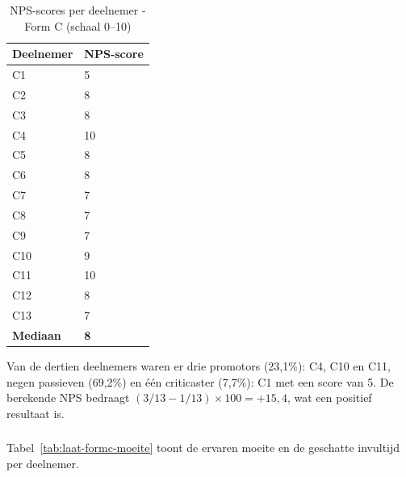 \begin{table}[h]
  \centering
  \caption[NPS-scores late test Form C]{NPS-scores per deelnemer - Form C (schaal 0–10)}
  \label{tab:laat-formc-nps}
  \begin{tabular}{ll}
    \hline
    \textbf{Deelnemer} & \textbf{NPS-score} \\
    \hline
    C1  & 5  \\
    C2  & 8  \\
    C3  & 8  \\
    C4  & 10 \\
    C5  & 8  \\
    C6  & 8  \\
    C7  & 7  \\
    C8  & 7  \\
    C9  & 7  \\
    C10 & 9  \\
    C11 & 10 \\
    C12 & 8  \\
    C13 & 7  \\
    \hline
    \textbf{Mediaan} & \textbf{8} \\
    \hline
  \end{tabular}
\end{table}

Van de dertien deelnemers waren er drie promotors (23,1\%): C4, C10 en C11, negen passieven (69,2\%) en één criticaster (7,7\%): C1 met een score van 5. De berekende NPS bedraagt $(3/13 - 1/13) \times 100 = +15{,}4$, wat een positief resultaat is.

\subsubsection{}

Tabel~\ref{tab:laat-formc-moeite} toont de ervaren moeite en de geschatte invultijd per deelnemer.

